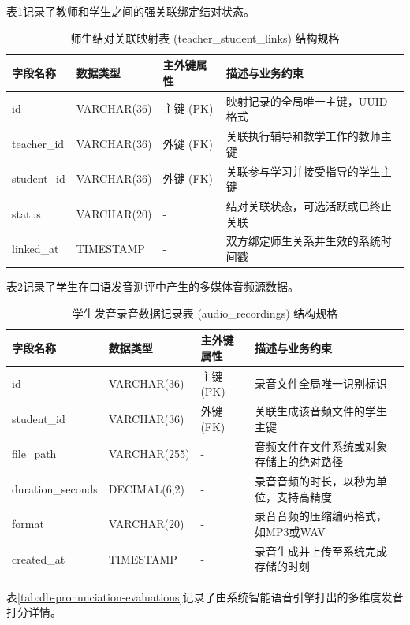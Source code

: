 表\ref{tab:db-teacher-student-links}记录了教师和学生之间的强关联绑定结对状态。

\begin{table}[H]
\centering
\caption{师生结对关联映射表 (teacher\_student\_links) 结构规格}
\label{tab:db-teacher-student-links}
\begin{tabularx}{\textwidth}{lllX}
\toprule
字段名称 & 数据类型 & 主外键属性 & 描述与业务约束 \\
\midrule
id & VARCHAR(36) & 主键 (PK) & 映射记录的全局唯一主键，UUID格式 \\
teacher\_id & VARCHAR(36) & 外键 (FK) & 关联执行辅导和教学工作的教师主键 \\
student\_id & VARCHAR(36) & 外键 (FK) & 关联参与学习并接受指导的学生主键 \\
status & VARCHAR(20) & - & 结对关联状态，可选活跃或已终止关联 \\
linked\_at & TIMESTAMP & - & 双方绑定师生关系并生效的系统时间戳 \\
\bottomrule
\end{tabularx}
\end{table}

表\ref{tab:db-audio-recordings}记录了学生在口语发音测评中产生的多媒体音频源数据。

\begin{table}[H]
\centering
\caption{学生发音录音数据记录表 (audio\_recordings) 结构规格}
\label{tab:db-audio-recordings}
\begin{tabularx}{\textwidth}{lllX}
\toprule
字段名称 & 数据类型 & 主外键属性 & 描述与业务约束 \\
\midrule
id & VARCHAR(36) & 主键 (PK) & 录音文件全局唯一识别标识 \\
student\_id & VARCHAR(36) & 外键 (FK) & 关联生成该音频文件的学生主键 \\
file\_path & VARCHAR(255) & - & 音频文件在文件系统或对象存储上的绝对路径 \\
duration\_seconds & DECIMAL(6,2) & - & 录音音频的时长，以秒为单位，支持高精度 \\
format & VARCHAR(20) & - & 录音音频的压缩编码格式，如MP3或WAV \\
created\_at & TIMESTAMP & - & 录音生成并上传至系统完成存储的时刻 \\
\bottomrule
\end{tabularx}
\end{table}

表\ref{tab:db-pronunciation-evaluations}记录了由系统智能语音引擎打出的多维度发音打分详情。

